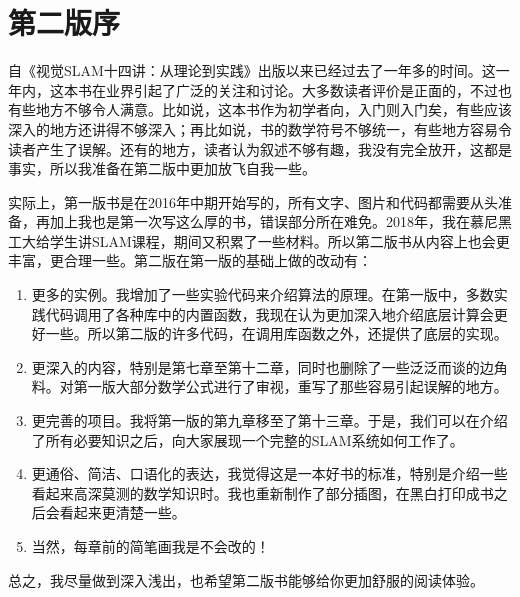 \thispagestyle{empty}
\chapter*{第二版序}
自《视觉SLAM十四讲：从理论到实践》出版以来已经过去了一年多的时间。这一年内，这本书在业界引起了广泛的关注和讨论。大多数读者评价是正面的，不过也有些地方不够令人满意。比如说，这本书作为初学者向，入门则入门矣，有些应该深入的地方还讲得不够深入；再比如说，书的数学符号不够统一，有些地方容易令读者产生了误解。还有的地方，读者认为叙述不够有趣，我没有完全放开，这都是事实，所以我准备在第二版中更加放飞自我一些。

实际上，第一版书是在2016年中期开始写的，所有文字、图片和代码都需要从头准备，再加上我也是第一次写这么厚的书，错误部分所在难免。2018年，我在慕尼黑工大给学生讲SLAM课程，期间又积累了一些材料。所以第二版书从内容上也会更丰富，更合理一些。第二版在第一版的基础上做的改动有：
\begin{enumerate}
\item 更多的实例。我增加了一些实验代码来介绍算法的原理。在第一版中，多数实践代码调用了各种库中的内置函数，我现在认为更加深入地介绍底层计算会更好一些。所以第二版的许多代码，在调用库函数之外，还提供了底层的实现。
\item 更深入的内容，特别是第七章至第十二章，同时也删除了一些泛泛而谈的边角料。对第一版大部分数学公式进行了审视，重写了那些容易引起误解的地方。
\item 更完善的项目。我将第一版的第九章移至了第十三章。于是，我们可以在介绍了所有必要知识之后，向大家展现一个完整的SLAM系统如何工作了。
\item 更通俗、简洁、口语化的表达，我觉得这是一本好书的标准，特别是介绍一些看起来高深莫测的数学知识时。我也重新制作了部分插图，在黑白打印成书之后会看起来更清楚一些。
\item 当然，每章前的简笔画我是不会改的！
\end{enumerate}

总之，我尽量做到深入浅出，也希望第二版书能够给你更加舒服的阅读体验。

\clearpage